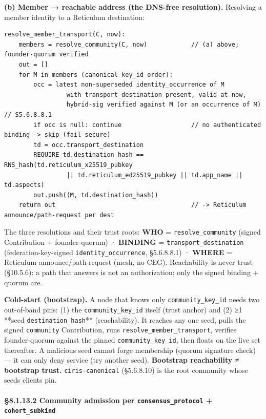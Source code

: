 \documentclass[11pt]{article}
\begin{document}
\textbf{(b) Member → reachable address (the DNS-free resolution).} Resolving a member identity to a Reticulum destination:


\begin{lstlisting}
resolve_member_transport(C, now):
    members = resolve_community(C, now)            // (a) above; founder-quorum verified
    out = []
    for M in members (canonical key_id order):
        occ = latest non-superseded identity_occurrence of M
                 with transport_destination present, valid at now,
                 hybrid-sig verified against M (or an occurrence of M)   // S5.6.8.8.1
        if occ is null: continue                   // no authenticated binding -> skip (fail-secure)
        td = occ.transport_destination
        REQUIRE td.destination_hash == RNS_hash(td.reticulum_x25519_pubkey
                 || td.reticulum_ed25519_pubkey || td.app_name || td.aspects)
        out.push((M, td.destination_hash))
    return out                                     // -> Reticulum announce/path-request per dest
\end{lstlisting}

The three resolutions and their trust roots: \textbf{WHO} = \texttt{resolve\_community} (signed Contribution + founder-quorum) · \textbf{BINDING} = \texttt{transport\_destination} (federation-key-signed \texttt{identity\_occurrence}, §5.6.8.8.1) · \textbf{WHERE} = Reticulum announce/path-request (mesh, no CEG). Reachability is never trust (§10.5.6): a path that answers is not an authorization; only the signed binding + quorum are.


\textbf{Cold-start (bootstrap).} A node that knows only \texttt{community\_key\_id} needs two out-of-band pins: (1) the \texttt{community\_key\_id} itself (trust anchor) and (2) ≥1 **seed \texttt{destination\_hash}** (reachability). It reaches any one seed, pulls the signed \texttt{community} Contribution, runs \texttt{resolve\_member\_transport}, verifies founder-quorum against the pinned \texttt{community\_key\_id}, then floats on the live set thereafter. A malicious seed cannot forge membership (quorum signature check) — it can only deny service (try another seed). \textbf{Bootstrap reachability ≠ bootstrap trust.} \texttt{ciris-canonical} (§5.6.8.10) is the root community whose seeds clients pin.


\paragraph{§8.1.13.2 Community admission per \texttt{consensus\_protocol} + \texttt{cohort\_subkind}}\mbox{}\\
\end{document}
